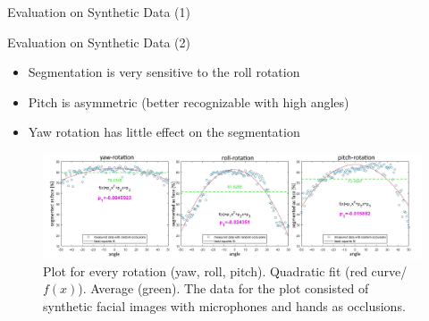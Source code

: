 \documentclass{beamer}
\begin{document}
\begin{frame}[c]{Evaluation on Synthetic Data (1)}
\begin{figure}
	\end{figure}
\end{frame}

\begin{frame}[c]{Evaluation on Synthetic Data (2)}
	\begin{itemize}
		\item Segmentation is very sensitive to the roll rotation
		\item Pitch is asymmetric (better recognizable with high angles)
		\item Yaw rotation has little effect on the segmentation
	\end{itemize}
	\vspace{-1.5em}
	\begin{figure}
		\hspace*{-.8cm}\includegraphics[width=1.15\textwidth]{evaluation_angles.png}
		\caption{Plot for every rotation (yaw, roll, pitch). Quadratic fit (red curve/$f(x)$). Average (green). The data for the plot consisted of synthetic facial images with microphones and hands as occlusions.}
	\end{figure}
\end{frame}
\end{document}
